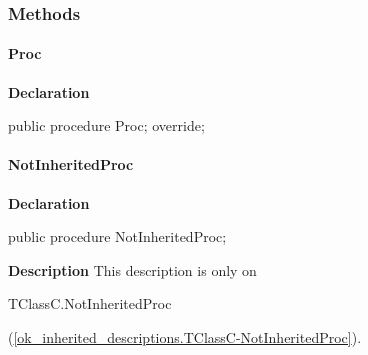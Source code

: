 \documentclass{report}
\begin{document}
\subsubsection*{\large{\textbf{Methods}}\normalsize\hspace{1ex}\hfill}
\paragraph*{Proc}\hspace*{\fill}

\begin{list}{}{
\setlength{\itemindent}{0cm}
\setlength{\listparindent}{0cm}
\setlength{\leftmargin}{\evensidemargin}
\addtolength{\leftmargin}{\tmplength}
\settowidth{\labelsep}{X}
\addtolength{\leftmargin}{\labelsep}
\setlength{\labelwidth}{\tmplength}
}
\begin{flushleft}
\item[\textbf{Declaration}\hfill]
\begin{ttfamily}
public procedure Proc; override;\end{ttfamily}


\end{flushleft}
\end{list}
\paragraph*{NotInheritedProc}\hspace*{\fill}

\begin{list}{}{
\setlength{\itemindent}{0cm}
\setlength{\listparindent}{0cm}
\setlength{\leftmargin}{\evensidemargin}
\addtolength{\leftmargin}{\tmplength}
\settowidth{\labelsep}{X}
\addtolength{\leftmargin}{\labelsep}
\setlength{\labelwidth}{\tmplength}
}
\begin{flushleft}
\item[\textbf{Declaration}\hfill]
\begin{ttfamily}
public procedure NotInheritedProc;\end{ttfamily}


\end{flushleft}
\par
\item[\textbf{Description}]
This description is only on \begin{ttfamily}TClassC.NotInheritedProc\end{ttfamily}(\ref{ok_inherited_descriptions.TClassC-NotInheritedProc}).

\end{list}
\end{document}
